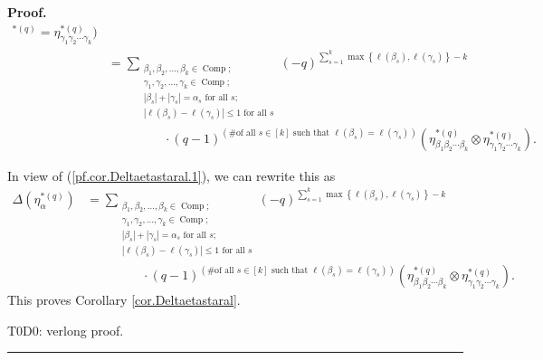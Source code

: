 \documentclass[numbers=enddot,12pt,final,onecolumn,notitlepage]{scrartcl}%
\theoremstyle{definition}
\newenvironment{proof}[1][Proof]{\noindent\textbf{#1.} }{\ \rule{0.5em}{0.5em}}
\let\sumnonlimits\sum
\renewcommand{\sum}{\sumnonlimits\limits}
\newenvironment{verlong}{}{}
\begin{document}
\begin{proof}
\begin{align*}
{{^{\ast\left(  q\right)  }=\eta_{\gamma_{1}\gamma_{2}\cdots\gamma_{k}}%
^{\ast\left(  q\right)  }\text{)}}}\\
&  =\sum_{\substack{\beta_{1},\beta_{2},\ldots,\beta_{k}\in
\operatorname*{Comp};\\\gamma_{1},\gamma_{2},\ldots,\gamma_{k}\in
\operatorname*{Comp};\\\left\vert \beta_{s}\right\vert +\left\vert \gamma
_{s}\right\vert =\alpha_{s}\text{ for all }s;\\\left\vert \ell\left(
\beta_{s}\right)  -\ell\left(  \gamma_{s}\right)  \right\vert \leq1\text{ for
all }s}}\left(  -q\right)  ^{\sum_{s=1}^{k}\max\left\{  \ell\left(  \beta
_{s}\right)  ,\ell\left(  \gamma_{s}\right)  \right\}  -k}\\
&  \ \ \ \ \ \ \ \ \ \ \ \ \ \ \ \ \ \ \ \ \cdot\left(  q-1\right)  ^{\left(
\text{\# of all }s\in\left[  k\right]  \text{ such that }\ell\left(  \beta
_{s}\right)  =\ell\left(  \gamma_{s}\right)  \right)  }\left(  \eta_{\beta
_{1}\beta_{2}\cdots\beta_{k}}^{\ast\left(  q\right)  }\otimes\eta_{\gamma
_{1}\gamma_{2}\cdots\gamma_{k}}^{\ast\left(  q\right)  }\right)  .
\end{align*}


In view of (\ref{pf.cor.Deltaetastaral.1}), we can rewrite this as
\begin{align*}
\Delta\left(  \eta_{\alpha}^{\ast\left(  q\right)  }\right)   &
=\sum_{\substack{\beta_{1},\beta_{2},\ldots,\beta_{k}\in\operatorname*{Comp}%
;\\\gamma_{1},\gamma_{2},\ldots,\gamma_{k}\in\operatorname*{Comp};\\\left\vert
\beta_{s}\right\vert +\left\vert \gamma_{s}\right\vert =\alpha_{s}\text{ for
all }s;\\\left\vert \ell\left(  \beta_{s}\right)  -\ell\left(  \gamma
_{s}\right)  \right\vert \leq1\text{ for all }s}}\left(  -q\right)
^{\sum_{s=1}^{k}\max\left\{  \ell\left(  \beta_{s}\right)  ,\ell\left(
\gamma_{s}\right)  \right\}  -k}\\
&  \ \ \ \ \ \ \ \ \ \ \ \ \ \ \ \ \ \ \ \ \cdot\left(  q-1\right)  ^{\left(
\text{\# of all }s\in\left[  k\right]  \text{ such that }\ell\left(  \beta
_{s}\right)  =\ell\left(  \gamma_{s}\right)  \right)  }\left(  \eta_{\beta
_{1}\beta_{2}\cdots\beta_{k}}^{\ast\left(  q\right)  }\otimes\eta_{\gamma
_{1}\gamma_{2}\cdots\gamma_{k}}^{\ast\left(  q\right)  }\right)  .
\end{align*}
This proves Corollary \ref{cor.Deltaetastaral}. \qedhere


\begin{verlong}
T0D0: verlong proof.
\end{verlong}
\end{proof}
\end{document}
